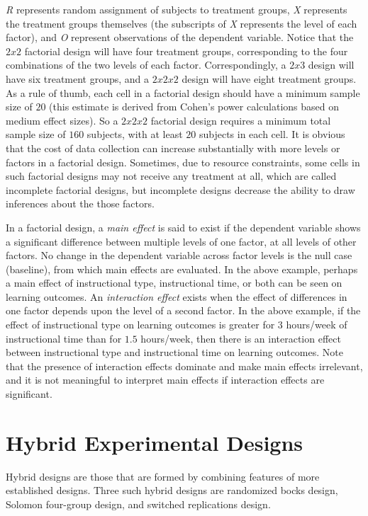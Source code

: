 \textit{R} represents random assignment of subjects to treatment groups, \textit{X} represents the treatment groups themselves (the subscripts of \textit{X} represents the level of each factor), and \textit{O} represent observations of the dependent variable. Notice that the $ 2 x 2 $ factorial design will have four treatment groups, corresponding to the four combinations of the two levels of each factor. Correspondingly, a $ 2 x 3 $ design will have six treatment groups, and a $ 2 x 2 x 2 $ design will have eight treatment groups. As a rule of thumb, each cell in a factorial design should have a minimum sample size of $ 20 $ (this estimate is derived from Cohen's power calculations based on medium effect sizes). So a $ 2 x 2 x 2 $ factorial design requires a minimum total sample size of $ 160 $ subjects, with at least $ 20 $ subjects in each cell. It is obvious that the cost of data collection can increase substantially with more levels or factors in a factorial design. Sometimes, due to resource constraints, some cells in such factorial designs may not receive any treatment at all, which are called incomplete factorial designs, but incomplete designs decrease the ability to draw inferences about the those factors.

In a factorial design, a \textit{main effect} is said to exist if the dependent variable shows a significant difference between multiple levels of one factor, at all levels of other factors. No change in the dependent variable across factor levels is the null case (baseline), from which main effects are evaluated. In the above example, perhaps a main effect of instructional type, instructional time, or both can be seen on learning outcomes. An \textit{interaction effect} exists when the effect of differences in one factor depends upon the level of a second factor. In the above example, if the effect of instructional type on learning outcomes is greater for $ 3 $ hours/week of instructional time than for $ 1.5 $ hours/week, then there is an interaction effect between instructional type and instructional time on learning outcomes. Note that the presence of interaction effects dominate and make main effects irrelevant, and it is not meaningful to interpret main effects if interaction effects are significant.

\section{Hybrid Experimental Designs}

Hybrid designs are those that are formed by combining features of more established designs. Three such hybrid designs are randomized bocks design, Solomon four-group design, and switched replications design.

